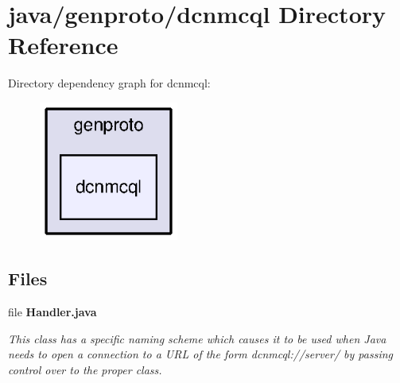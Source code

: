 \section{java/genproto/dcnmcql Directory Reference}
\label{dir_071e5978995a6bdbb4f4891334cbfb92}
Directory dependency graph for dcnmcql\+:
\nopagebreak
\begin{figure}[H]
\begin{center}
\leavevmode
\includegraphics[width=130pt]{dir_071e5978995a6bdbb4f4891334cbfb92_dep}
\end{center}
\end{figure}
\subsection*{Files}
\begin{DoxyCompactItemize}
\item 
file {\bf Handler.\+java}
\begin{DoxyCompactList}\small\item\em This class has a specific naming scheme which causes it to be used when Java needs to open a connection to a U\+R\+L of the form dcnmcql\+://server/ by passing control over to the proper class. \end{DoxyCompactList}\end{DoxyCompactItemize}
